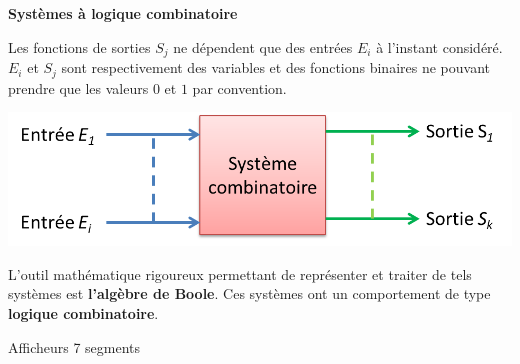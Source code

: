 \documentclass[10pt,fleqn]{article} %
\begin{document}
\begin{defi}  \textbf{Systèmes à logique combinatoire}

\begin{minipage}[c]{0.55\linewidth}
Les fonctions de sorties $S_j$ ne dépendent que des entrées $E_i$ à l'instant
considéré. $E_i$ et $S_j$ sont respectivement des variables et des fonctions
binaires ne pouvant prendre que les valeurs $0$ et $1$ par convention.
\end{minipage} \hfill
\begin{minipage}[c]{0.4\linewidth}
 \begin{center}
    \includegraphics[width=\textwidth]{images/comb}
  \end{center}
\end{minipage}
\end{defi} 





L'outil mathématique rigoureux permettant de représenter et traiter de tels
systèmes est \textbf{l'algèbre de Boole}. Ces systèmes ont un comportement de
type \textbf{logique combinatoire}.


\begin{exemple}
 Afficheurs 7 segments
\end{exemple}
\end{document}
